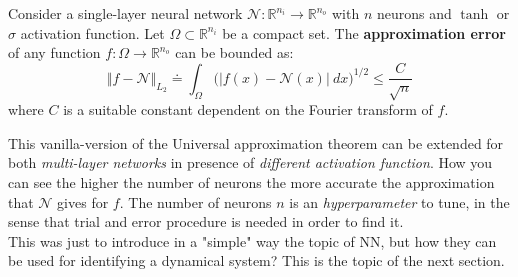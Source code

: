 \begin{theorem}
    Consider a single-layer neural network $\mathcal{N}:\mathbb{R}^{n_i}\to\mathbb{R}^{n_o}$ with $n$ neurons and $\tanh$ or $\sigma$ activation function. Let $\Omega\subset\mathbb{R}^{n_i}$ be a compact set. The \textbf{approximation error} of any function $f:\Omega\to\mathbb{R}^{n_o}$ can be bounded as: 
    \begin{equation}
        \Vert f-\mathcal{N} \Vert_{L_2} \doteq
        \int_{\Omega} \bigg(
            \vert f(x) - \mathcal{N}(x) \vert \ dx 
        \bigg)^{1/2} \le
        \frac{C}{\sqrt{n}}
    \end{equation}
    where $C$ is a suitable constant dependent on the Fourier transform of $f$.
\end{theorem}
This vanilla-version of the Universal approximation theorem can be extended for both \textit{multi-layer networks} in presence of \textit{different activation function}. How you can see the higher the number of neurons the more accurate the approximation that $\mathcal{N}$ gives for $f$. The number of neurons $n$ is an \textit{hyperparameter} to tune, in the sense that trial and error procedure is needed in order to find it.\\
This was just to introduce in a "simple" way the topic of NN, but how they can be used for identifying a dynamical system? This is the topic of the next section.

